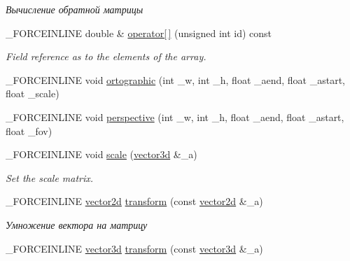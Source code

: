 \begin{DoxyCompactItemize}
\begin{DoxyCompactList}\small\item\em Вычисление обратной матрицы \end{DoxyCompactList}\item 
\hypertarget{classbt_1_1matrix4d_acbb4683bca7e275abc737a08c41a6366}{\-\_\-\-F\-O\-R\-C\-E\-I\-N\-L\-I\-N\-E double \& \hyperlink{classbt_1_1matrix4d_acbb4683bca7e275abc737a08c41a6366}{operator\mbox{[}$\,$\mbox{]}} (unsigned int id) const }\label{classbt_1_1matrix4d_acbb4683bca7e275abc737a08c41a6366}

\begin{DoxyCompactList}\small\item\em Field reference as to the elements of the array. \end{DoxyCompactList}\item 
\-\_\-\-F\-O\-R\-C\-E\-I\-N\-L\-I\-N\-E void \hyperlink{classbt_1_1matrix4d_a0a2f7697b962f033209efbd6d65f65bc}{ortographic} (int \-\_\-w, int \-\_\-h, float \-\_\-aend, float \-\_\-astart, float \-\_\-scale)
\item 
\-\_\-\-F\-O\-R\-C\-E\-I\-N\-L\-I\-N\-E void \hyperlink{classbt_1_1matrix4d_a135a3a1dcaea5440c0b355c8a72eb62f}{perspective} (int \-\_\-w, int \-\_\-h, float \-\_\-aend, float \-\_\-astart, float \-\_\-fov)
\item 
\hypertarget{classbt_1_1matrix4d_a97fbe56d388075999ab2277450885a6c}{\-\_\-\-F\-O\-R\-C\-E\-I\-N\-L\-I\-N\-E void \hyperlink{classbt_1_1matrix4d_a97fbe56d388075999ab2277450885a6c}{scale} (\hyperlink{classbt_1_1vector3d}{vector3d} \&\-\_\-a)}\label{classbt_1_1matrix4d_a97fbe56d388075999ab2277450885a6c}

\begin{DoxyCompactList}\small\item\em Set the scale matrix. \end{DoxyCompactList}\item 
\hypertarget{classbt_1_1matrix4d_abce197509ff670e87a09488b26b424b5}{\-\_\-\-F\-O\-R\-C\-E\-I\-N\-L\-I\-N\-E \hyperlink{classbt_1_1vector2d}{vector2d} \hyperlink{classbt_1_1matrix4d_abce197509ff670e87a09488b26b424b5}{transform} (const \hyperlink{classbt_1_1vector2d}{vector2d} \&\-\_\-a)}\label{classbt_1_1matrix4d_abce197509ff670e87a09488b26b424b5}

\begin{DoxyCompactList}\small\item\em Умножение вектора на матрицу \end{DoxyCompactList}\item 
\hypertarget{classbt_1_1matrix4d_adf6444ec2cb9e10d34d20c8617dd9207}{\-\_\-\-F\-O\-R\-C\-E\-I\-N\-L\-I\-N\-E \hyperlink{classbt_1_1vector3d}{vector3d} \hyperlink{classbt_1_1matrix4d_adf6444ec2cb9e10d34d20c8617dd9207}{transform} (const \hyperlink{classbt_1_1vector3d}{vector3d} \&\-\_\-a)}\label{classbt_1_1matrix4d_adf6444ec2cb9e10d34d20c8617dd9207}


\end{DoxyCompactItemize}
